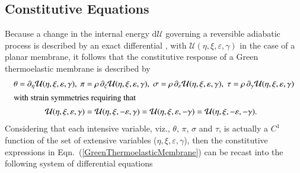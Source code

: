 \subsection{Constitutive Equations}

Because a change in the internal energy $\mathrm{d}\mathcal{U}$ governing a reversible adiabatic process is described by an exact differential \cite{Caratheodory09}, with $\mathcal{U}(\eta, \xi, \varepsilon, \gamma)$ in the case of a planar membrane, it follows that the constitutive response of a Green thermo\-elastic membrane is described by
\begin{subequations}
    \label{GreenThermoelasticity}
    \begin{align}
    \theta = \partial_{\eta} \mathcal{U}(\eta, \xi, \varepsilon, \gamma) , \;
    \pi & = \rho \, \partial_{\xi} \mathcal{U}(\eta, \xi, \varepsilon, \gamma) , \;
    \sigma = \rho \, \partial_{\varepsilon} \mathcal{U}(\eta, \xi, \varepsilon, \gamma) , \;
    \tau = \rho \, \partial_{\gamma} \mathcal{U}(\eta, \xi, \varepsilon, \gamma)
    \label{GreenThermoelasticMembrane} \\
    \intertext{with strain symmetries requiring that}
    \mathcal{U}(\eta, \xi, \varepsilon, \gamma) & =
    \mathcal{U}(\eta, \xi, -\varepsilon, \gamma) = 
    \mathcal{U}(\eta, \xi, \varepsilon, -\gamma) = 
    \mathcal{U}(\eta, \xi, -\varepsilon, -\gamma) .
    \label{internalEnergyInveriance}
    \end{align}
\end{subequations}
Considering that each intensive variable, viz., $\theta$, $\pi$, $\sigma$ and $\tau$, is actually a $C^1$ function of the set of extensive variables ($\eta , \xi , \varepsilon , \gamma$), then the constitutive expressions in Eqn.~(\ref{GreenThermoelasticMembrane}) can be recast into the following system of differential equations
